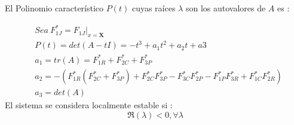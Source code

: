 El Polinomio caracter\'istico $P(t)$ cuyas ra\'ices $\lambda$ son los autovalores de $A$ es :

\begin{equation}
\begin{aligned}
& Sea \ F^*_{1J} = \left. F_{1J}\right|_{x=\mathbf{X}} \\
&P(t) = det(A-tI) = - t^3 + a_1t^2 + a_2 t + a3 \\
& a_1 = tr(A) = F^*_{1R}  + F^*_{2C} + F^*_{3P} \\
& a_2 =  -(F^*_{1R}(F^*_{2C}+F^*_{3P}) + F^*_{2C}F^*_{3P} - F^*_{3C}F^*_{2P} - F^*_{1P}F^*_{3R} + F^*_{1C}F^*_{2R}) \\
& a_3 = det(A) 
\end{aligned}
\end{equation}
El sistema se considera localmente estable \citep{yodzis1989introduction} si :
\begin{equation}\label{eq:estab}
\Re(\lambda) < 0 , \forall  \lambda
\end{equation}
